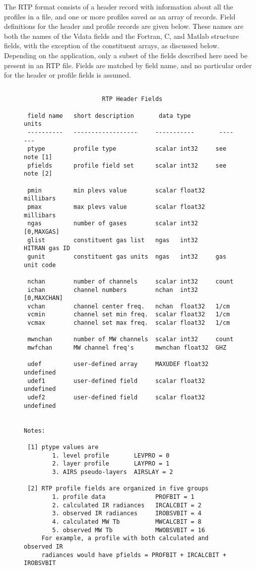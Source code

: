\documentclass[12pt]{article}
\begin{document}
The RTP format consists of a header record with information about
all the profiles in a file, and one or more profiles saved as an
array of records.  Field definitions for the header and profile
records are given below.  These names are both the names of the
Vdata fields and the Fortran, C, and Matlab structure fields, with
the exception of the constituent arrays, as discussed below.
Depending on the application, only a subset of the fields described
here need be present in an RTP file.  Fields are matched by field
name, and no particular order for the header or profile fields is
assumed.


\begin{figure}
\vskip-14mm
{\small
\begin{verbatim}

                      RTP Header Fields

 field name   short description       data type         units
 ----------   ------------------     -----------       -------
 ptype        profile type           scalar int32     see note [1]
 pfields      profile field set      scalar int32     see note [2]

 pmin         min plevs value        scalar float32   millibars
 pmax         max plevs value        scalar float32   millibars
 ngas         number of gases        scalar int32     [0,MAXGAS]
 glist        constituent gas list   ngas   int32     HITRAN gas ID
 gunit        constituent gas units  ngas   int32     gas unit code

 nchan        number of channels     scalar int32     count
 ichan        channel numbers        nchan  int32     [0,MAXCHAN]
 vchan        channel center freq.   nchan  float32   1/cm
 vcmin        channel set min freq.  scalar float32   1/cm
 vcmax        channel set max freq.  scalar float32   1/cm

 mwnchan      number of MW channels  scalar int32     count
 mwfchan      MW channel freq's      mwnchan float32  GHZ

 udef         user-defined array     MAXUDEF float32  undefined
 udef1        user-defined field     scalar float32   undefined
 udef2        user-defined field     scalar float32   undefined


Notes:

 [1] ptype values are
        1. level profile       LEVPRO = 0
        2. layer profile       LAYPRO = 1
        3. AIRS pseudo-layers  AIRSLAY = 2

 [2] RTP profile fields are organized in five groups
        1. profile data              PROFBIT = 1
        2. calculated IR radiances   IRCALCBIT = 2
        3. observed IR radiances     IROBSVBIT = 4
        4. calculated MW Tb          MWCALCBIT = 8
        5. observed MW Tb            MWOBSVBIT = 16
     For example, a profile with both calculated and observed IR
     radiances would have pfields = PROFBIT + IRCALCBIT + IROBSVBIT

\end{verbatim}
}
\end{figure}
\end{document}
